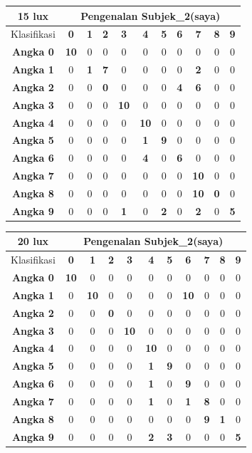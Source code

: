 \begin{tabular}{|c|c|c|c|c|c|c|c|c|c|c|}
	\hline 15 lux
	& \multicolumn{10}{|c|}{Pengenalan Subjek\_2(saya)} \\
	\hline  Klasifikasi&\textbf{0} &\textbf{1} &\textbf{2} &\textbf{3} &\textbf{4}&\textbf{5} &\textbf{6}&\textbf{7}&\textbf{8}&\textbf{9}\\
	\hline \textbf{Angka 0} &\textbf{10} &0 &0 &0 &0 &0 &0 &0 &0 &0\\
	\hline \textbf{Angka 1} &0 &\textbf{1} &\textbf{7} &0 &0 &0 &0 &\textbf{2} &0 &0\\
	\hline \textbf{Angka 2} &0 &0 &\textbf{0} &0 &0 &0 &\textbf{4} &\textbf{6} &0 &0\\
	\hline \textbf{Angka 3} &0 &0 &0 &\textbf{10} &0 &0 &0 &0 &0 &0\\
	\hline \textbf{Angka 4} &0 &0 &0 &0 &\textbf{10} &0 &0 &0 &0 &0\\
	\hline \textbf{Angka 5} &0 &0 &0 &0 &\textbf{1} &\textbf{9} &0 &0 &0 &0 \\
	\hline \textbf{Angka 6} &0 &0 &0 &0 &\textbf{4} &0 &\textbf{6} &0 &0 &0\\
	\hline \textbf{Angka 7} &0 &0 &0 &0 &0 &0 &0 &\textbf{10} &0 &0\\
	\hline \textbf{Angka 8} &0 &0 &0 &0 &0 &0 &0 &\textbf{10} &\textbf{0} &0 \\
	\hline \textbf{Angka 9} &0 &0 &0 &\textbf{1} &0 &\textbf{2} &0 &\textbf{2} &0 &\textbf{5} \\
	\hline
\end{tabular}

\begin{tabular}{|c|c|c|c|c|c|c|c|c|c|c|}
	\hline 20 lux
	& \multicolumn{10}{|c|}{Pengenalan Subjek\_2(saya)} \\
	\hline  Klasifikasi&\textbf{0} &\textbf{1} &\textbf{2} &\textbf{3} &\textbf{4}&\textbf{5} &\textbf{6}&\textbf{7}&\textbf{8}&\textbf{9}\\
	\hline \textbf{Angka 0} &\textbf{10} &0 &0 &0 &0 &0 &0 &0 &0 &0\\
	\hline \textbf{Angka 1} &0 &\textbf{10} &0 &0 &0 &0 &\textbf{10} &0 &0 &0\\
	\hline \textbf{Angka 2} &0 &0 &\textbf{0} &0 &0 &0 &0 &0 &0 &0\\
	\hline \textbf{Angka 3} &0 &0 &0 &\textbf{10} &0 &0 &0 &0 &0 &0\\
	\hline \textbf{Angka 4} &0 &0 &0 &0 &\textbf{10} &0 &0 &0 &0 &0\\
	\hline \textbf{Angka 5} &0 &0 &0 &0 &\textbf{1} &\textbf{9} &0 &0 &0 &0 \\
	\hline \textbf{Angka 6} &0 &0 &0 &0 &\textbf{1} &0 &\textbf{9} &0 &0 &0\\
	\hline \textbf{Angka 7} &0 &0 &0 &0 &\textbf{1} &0 &\textbf{1} &\textbf{8} &0 &0\\
	\hline \textbf{Angka 8} &0 &0 &0 &0 &0 &0 &0 &\textbf{9} &\textbf{1} &0 \\
	\hline \textbf{Angka 9} &0 &0 &0 &0 &\textbf{2} &\textbf{3} &0 &0 &0 &\textbf{5} \\
	\hline
\end{tabular}


